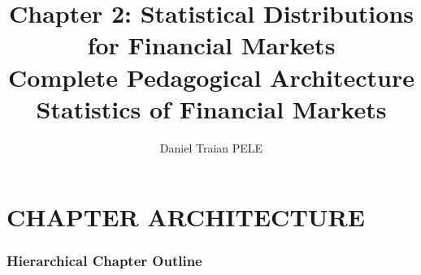\documentclass[11pt, a4paper]{article}
\title{\textbf{Chapter 2: Statistical Distributions for Financial Markets}\\[6pt]
\large Complete Pedagogical Architecture\\[4pt]
\normalsize Statistics of Financial Markets}
\author{Daniel Traian PELE}
\date{}
\theoremstyle{definition}
\begin{document}
\maketitle
\tableofcontents
\newpage

\part{CHAPTER ARCHITECTURE}

\section{Hierarchical Chapter Outline}
\end{document}
